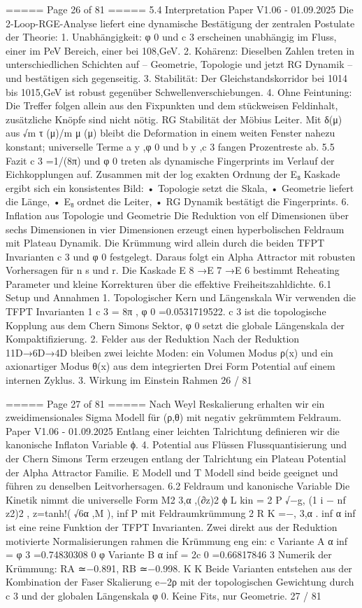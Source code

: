\begin{MyVerbatim}
===== Page 26 of 81 =====
5.4 Interpretation
Paper V1.06 - 01.09.2025
Die 2-Loop-RGE-Analyse liefert eine dynamische Bestätigung der zentralen Postulate der Theorie:
1. Unabhängigkeit: φ 0 und c 3 erscheinen unabhängig im Fluss, einer im PeV Bereich, einer bei 108,GeV.
2. Kohärenz: Dieselben Zahlen treten in unterschiedlichen Schichten auf – Geometrie, Topologie und jetzt RG Dynamik
– und bestätigen sich gegenseitig.
3. Stabilität: Der Gleichstandskorridor bei
1014
bis
1015,GeV
ist robust gegenüber Schwellenverschiebungen.
4. Ohne Feintuning: Die Treffer folgen allein aus den Fixpunkten und dem stückweisen Feldinhalt, zusätzliche Knöpfe
sind nicht nötig.
RG Stabilität der Möbius Leiter.
Mit δ(μ) aus √m τ (μ)/m μ (μ) bleibt die Deformation in einem weiten Fenster nahezu konstant; universelle Terme a y ,φ 0
und b y ,c 3 fangen Prozentreste ab.
5.5 Fazit
c 3 =1/(8π) und φ 0 treten als dynamische Fingerprints im Verlauf der Eichkopplungen auf. Zusammen mit der log
exakten Ordnung der E₈ Kaskade ergibt sich ein konsistentes Bild:
• Topologie setzt die Skala,
• Geometrie liefert die Länge,
• E₈ ordnet die Leiter,
• RG Dynamik bestätigt die Fingerprints.
6. Inflation aus Topologie und Geometrie
Die Reduktion von elf Dimensionen über sechs Dimensionen in vier Dimensionen erzeugt einen hyperbolischen
Feldraum mit Plateau Dynamik. Die Krümmung wird allein durch die beiden TFPT Invarianten c 3 und φ 0 festgelegt.
Daraus folgt ein Alpha Attractor mit robusten Vorhersagen für n s und r. Die Kaskade E 8 →E 7 →E 6 bestimmt Reheating
Parameter und kleine Korrekturen über die effektive Freiheitszahldichte.
6.1 Setup und Annahmen
1. Topologischer Kern und Längenskala
Wir verwenden die TFPT Invarianten
1
c 3 = 8π , φ 0 =0.0531719522.
c 3 ist die topologische Kopplung aus dem Chern Simons Sektor, φ 0 setzt die globale Längenskala der Kompaktifizierung.
2. Felder aus der Reduktion
Nach der Reduktion 11D→6D→4D bleiben zwei leichte Moden: ein Volumen Modus ρ(x) und ein axionartiger Modus
θ(x) aus dem integrierten Drei Form Potential auf einem internen Zyklus.
3. Wirkung im Einstein Rahmen
26 / 81

===== Page 27 of 81 =====
Nach Weyl Reskalierung erhalten wir ein zweidimensionales Sigma Modell für (ρ,θ) mit negativ gekrümmtem Feldraum.
Paper V1.06 - 01.09.2025
Entlang einer leichten Talrichtung definieren wir die kanonische Inflaton Variable ϕ.
4. Potential aus Flüssen
Flussquantisierung und der Chern Simons Term erzeugen entlang der Talrichtung ein Plateau Potential der Alpha
Attractor Familie. E Modell und T Modell sind beide geeignet und führen zu denselben Leitvorhersagen.
6.2 Feldraum und kanonische Variable
Die Kinetik nimmt die universelle Form
M2 3,α ,(∂z)2 ϕ
L
kin
=
2
P √−g,
(1
i
−
nf
z2)2
, z=tanh!(
√6α ,M
),
inf P
mit Feldraumkrümmung
2
R K =−, 3,α .
inf
α inf ist eine reine Funktion der TFPT Invarianten. Zwei direkt aus der Reduktion motivierte Normalisierungen rahmen die
Krümmung eng ein:
c
Variante A α inf = φ 3 =0.74830308
0
φ
Variante B α inf = 2c 0 =0.66817846
3
Numerik der Krümmung: RA ≃−0.891, RB ≃−0.998.
K K
Beide Varianten entstehen aus der Kombination der Faser Skalierung e−2ρ mit der topologischen Gewichtung durch c 3
und der globalen Längenskala φ 0. Keine Fits, nur Geometrie.
27 / 81


\end{MyVerbatim}
